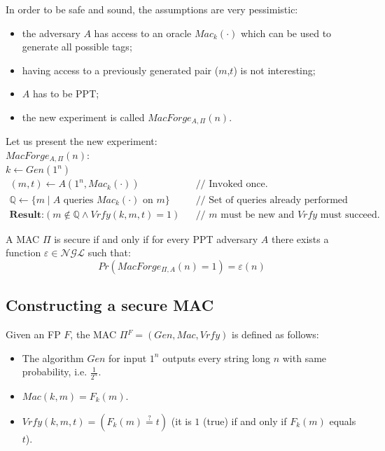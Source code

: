\documentclass[../main]{subfiles}
\begin{document}
\noindent
In order to be safe and sound, the assumptions are very pessimistic:
\begin{itemize}
    \item the adversary $A$ has access to an oracle $Mac_k(\cdot)$ which can be used to generate all possible tags;
    \item having access to a previously generated pair ($m$,$t$) is not interesting;
    \item $A$ has to be PPT;
    \item the new experiment is called $MacForge_{A,\Pi}(n)$.
\end{itemize}

\noindent
Let us present the new experiment:\\
$MacForge_{A,\Pi}(n):$\\
$k \leftarrow{} Gen(1^n)$\\
\begin{align*}
(m,t) \leftarrow{} A(1^n,Mac_k(\cdot)) & & \text{// Invoked once.}\\
\mathbb{Q} \leftarrow{} \{m \; | \; A \text{ queries } Mac_k(\cdot) \text{ on } m\} & & \text{// Set of queries already performed by MacForge.}\\
\textbf{Result:} (m \notin{\mathbb{Q}} \wedge{} Vrfy(k,m,t) = 1) & & \text{// $m$ must be new and $Vrfy$ must succeed.}
\end{align*}

\begin{definition}
    A MAC $\Pi$ is secure if and only if for every PPT adversary $A$ there exists a function $\varepsilon{} \in{} \mathcal{NGL}$ such that:
    $$Pr(MacForge_{\Pi,A}(n) = 1) = \varepsilon(n)$$
\end{definition}
\subsection{Constructing a secure MAC}
\begin{definition}
    Given an FP $F$, the MAC $\Pi{}^F = (Gen, Mac, Vrfy)$ is defined as follows:
    \begin{itemize}
        \item The algorithm $Gen$ for input $1^n$ outputs every string long $n$ with same probability, i.e. $\frac{1}{2^n}$.
        \item $Mac(k,m) = F_k(m)$.
        \item $Vrfy(k,m,t) = (F_k(m)\stackrel{?}{=}t)$ (it is $1$ (true) if and only if $F_k(m)$ equals $t$).
    \end{itemize}
\end{definition}
\end{document}
